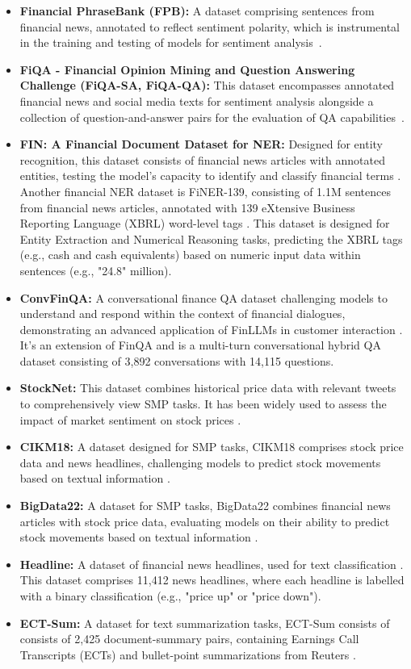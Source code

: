 \begin{itemize}
	\item \textbf{Financial PhraseBank (FPB):} A dataset comprising sentences from financial news, annotated to reflect sentiment polarity, which is instrumental in the training and testing of models for sentiment analysis~\cite{malo2014good}.
	\item \textbf{FiQA - Financial Opinion Mining and Question Answering Challenge (FiQA-SA, FiQA-QA):} This dataset encompasses annotated financial news and social media texts for sentiment analysis alongside a collection of question-and-answer pairs for the evaluation of QA capabilities~\cite{maia2018www}.
	\item \textbf{FIN: A Financial Document Dataset for NER:} {Designed for entity recognition, this dataset consists of financial news articles with annotated entities, testing the model's capacity to identify and classify financial terms \textcite{alvarado2015domain}.
		      Another financial NER dataset is FiNER-139, consisting of 1.1M sentences from financial news articles, annotated with 139 eXtensive Business Reporting Language (XBRL) word-level tags \cite{loukas2022finer}. This dataset is designed for Entity Extraction and Numerical Reasoning tasks, predicting the XBRL tags (e.g., cash and cash equivalents) based on numeric input data within sentences (e.g., "24.8" million).}
	\item \textbf{ConvFinQA:} {A conversational finance QA dataset challenging models to understand and respond within the context of financial dialogues, demonstrating an advanced application of FinLLMs in customer interaction \textcite{chen2022convfinqa}. It's an extension of FinQA and is a multi-turn conversational hybrid QA dataset consisting of 3,892 conversations with 14,115 questions.}
	\item \textbf{StockNet:} {This dataset combines historical price data with relevant tweets to comprehensively view SMP tasks. It has been widely used to assess the impact of market sentiment on stock prices \cite{xu2018stock}.}
	\item \textbf{CIKM18:} {A dataset designed for SMP tasks, CIKM18 comprises stock price data and news headlines, challenging models to predict stock movements based on textual information \cite{wu2018hybrid}.}
	\item \textbf{BigData22:} {A dataset for SMP tasks, BigData22 combines financial news articles with stock price data, evaluating models on their ability to predict stock movements based on textual information \textcite{soun2022accurate}.}
	\item \textbf{Headline:} {A dataset of financial news headlines, used for text classification \cite{sinha2021impact}. This dataset comprises 11,412 news headlines, where each headline is labelled with a binary classification (e.g., "price up" or "price down").}
	\item \textbf{ECT-Sum:} {A dataset for text summarization tasks, ECT-Sum consists of consists of 2,425 document-summary pairs, containing Earnings Call Transcripts (ECTs) and bullet-point summarizations from Reuters \cite{mukherjee2022ectsum}.}
\end{itemize}

